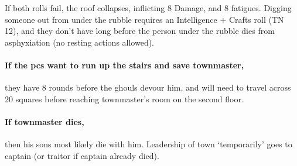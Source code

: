 If both rolls fail, the roof collapses, inflicting 8 Damage, and 8 \glspl{fatigue}.
Digging someone out from under the rubble requires an Intelligence + Crafts roll (TN 12), and they don't have long before the person under the rubble dies from asphyxiation (no resting actions allowed).

\paragraph{If the \glspl{pc} want to run up the stairs and save \gls{townmaster},}
they have 8 rounds before the ghouls devour him, and will need to travel across 20 squares before reaching \gls{townmaster}'s room on the second floor.

\paragraph{If \gls{townmaster} dies,}
then his sons most likely die with him.
Leadership of \gls{town} `temporarily' goes to \Gls{captain} (or \gls{traitor} if \gls{captain} already died).


